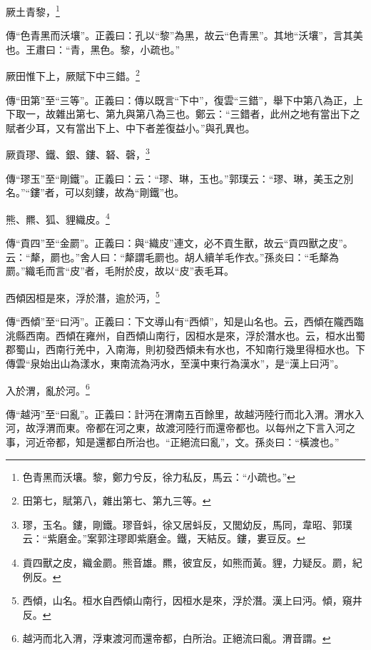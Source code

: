 厥土青黎，\footnote{色青黑而沃壤。黎，鄭力兮反，徐力私反，馬云：“小疏也。”}

{\noindent\zhuan{}\fzbyks 傳“色青黑而沃壤”。正義曰：孔以“黎”為黑，故云“色青黑”。其地“沃壤”，言其美也。王肅曰：“青，黑色。黎，小疏也。” \par}

厥田惟下上，厥賦下中三錯。\footnote{田第七，賦第八，雜出第七、第九三等。}

{\noindent\zhuan{}\fzbyks 傳“田第”至“三等”。正義曰：傳以既言“下中”，復雲“三錯”，舉下中第八為正，上下取一，故雜出第七、第九與第八為三也。鄭云：“三錯者，此州之地有當出下之賦者少耳，又有當出下上、中下者差復益小。”與孔異也。 \par}

厥貢璆、鐵、銀、鏤、砮、磬，\footnote{璆，玉名。鏤，剛鐵。璆音蚪，徐又居蚪反，又閭幼反，馬同，韋昭、郭璞云：“紫磨金。”案郭注璆即紫磨金。鐵，天結反。鏤，婁豆反。}

{\noindent\zhuan{}\fzbyks 傳“璆玉”至“剛鐵”。正義曰：云：“璆、琳，玉也。”郭璞云：“璆、琳，美玉之別名。”“鏤”者，可以刻鏤，故為“剛鐵”也。 \par}

熊、羆、狐、貍織皮。\footnote{貢四獸之皮，織金罽。熊音雄。羆，彼宜反，如熊而黃。貍，力疑反。罽，紀例反。}

{\noindent\zhuan{}\fzbyks 傳“貢四”至“金罽”。正義曰：與“織皮”連文，必不貢生獸，故云“貢四獸之皮”。云：“犛，罽也。”舍人曰：“犛謂毛罽也。胡人續羊毛作衣。”孫炎曰：“毛犛為罽。”織毛而言“皮”者，毛附於皮，故以“皮”表毛耳。 \par}

西傾因桓是來，浮於潛，逾於沔，\footnote{西傾，山名。桓水自西傾山南行，因桓水是來，浮於潛。漢上曰沔。傾，窺井反。}

{\noindent\zhuan{}\fzbyks 傳“西傾”至“曰沔”。正義曰：下文導山有“西傾”，知是山名也。云，西傾在隴西臨洮縣西南。西傾在雍州，自西傾山南行，因桓水是來，浮於潛水也。云，桓水出蜀郡蜀山，西南行羌中，入南海，則初發西傾未有水也，不知南行幾里得桓水也。下傳雲“泉始出山為漾水，東南流為沔水，至漢中東行為漢水”，是“漢上曰沔”。 \par}

入於渭，亂於河。\footnote{越沔而北入渭，浮東渡河而還帝都，白所治。正絕流曰亂。渭音謂。}

{\noindent\zhuan{}\fzbyks 傳“越沔”至“曰亂”。正義曰：計沔在渭南五百餘里，故越沔陸行而北入渭。渭水入河，故浮渭而東。帝都在河之東，故渡河陸行而還帝都也。以每州之下言入河之事，河近帝都，知是還都白所治也。“正絕流曰亂”，文。孫炎曰：“橫渡也。” \par}

